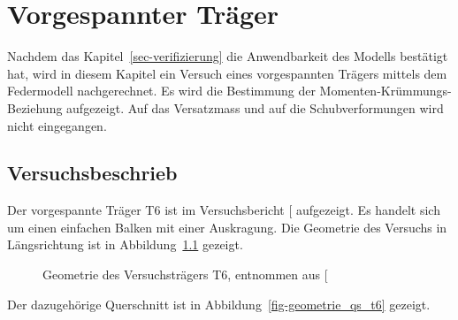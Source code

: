 \documentclass[
  11pt,
  letterpaper,
]{scrreprt}
\begin{document}

\chapter{Vorgespannter Träger}\label{vorgespannter-truxe4ger}

Nachdem das Kapitel~\ref{sec-verifizierung} die Anwendbarkeit des
Modells bestätigt hat, wird in diesem Kapitel ein Versuch eines
vorgespannten Trägers mittels dem Federmodell nachgerechnet. Es wird die
Bestimmung der Momenten-Krümmungs-Beziehung aufgezeigt. Auf das
Versatzmass und auf die Schubverformungen wird nicht eingegangen.

\section{Versuchsbeschrieb}\label{versuchsbeschrieb}

Der vorgespannte Träger T6 ist im Versuchsbericht
{[}\citeproc{ref-sigrist_versuche_1993}{5}{]} aufgezeigt. Es handelt
sich um einen einfachen Balken mit einer Auskragung. Die Geometrie des
Versuchs in Längsrichtung ist in Abbildung~\ref{fig-geometrie_t6}
gezeigt.

\begin{figure}[H]


\caption{\label{fig-geometrie_t6}Geometrie des Versuchsträgers T6,
entnommen aus {[}\citeproc{ref-sigrist_versuche_1993}{5}{]}}

\end{figure}%

Der dazugehörige Querschnitt ist in Abbildung~\ref{fig-geometrie_qs_t6}
gezeigt.
\end{document}
